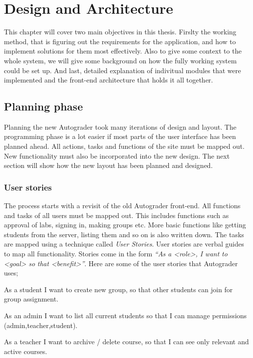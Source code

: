 \chapter{Design and Architecture}
This chapter will cover two main objectives in this thesis. Firslty the working method, that is figuring out the requirements for the application, and how to implement solutions for them most effectively. Also to give some context to the whole system, we will give some background on how the fully working system could be set up. And last, detailed explanation of indivitual modules that were implemented and the front-end architecture that holds it all together.

\section{Planning phase}
Planning the new Autograder took many iterations of design and layout. The programming phase is a lot easier if most parts of the user interface has been planned ahead. All actions, tasks and functions of the site must be mapped out. New functionality must also be incorporated into the new design. The next section will show how the new layout has been planned and designed.

\subsection{User stories}
The process starts with a revisit of the old Autograder front-end. All functions and tasks of all users must be mapped out. This includes functions such as approval of labs, signing in, making groups etc. More basic functions like getting students from the server, listing them and so on is also written down. The tasks are mapped using a technique called \emph{User Stories}. User stories are verbal guides to map all functionality. Stories come in the form \emph{``As a <role>, I want to <goal> so that <benefit>''}. Here are some of the user stories that Autograder uses;

\begin{itemize*}
\item As a student I want to create new group, so that other students can join for group assignment.
\item As an admin I want to list all current students so that I can manage permissions (admin,teacher,student).
\item As a teacher I want to archive / delete course, so that I can see only relevant and active courses.
\end{itemize*}

